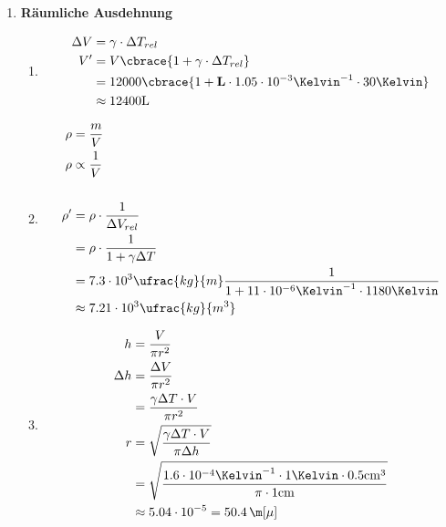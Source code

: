\documentclass[11pt,letterpaper]{article}
\begin{document}
\begin{enumerate}
    
    \item \textbf{Räumliche Ausdehnung}
    \begin{enumerate}
        \item 
            \begin{align*}
                \Delta V &= \gamma \cdot \Delta T _{rel}\\
                V' &=V\cbrace{1+ \gamma \cdot \Delta T _{rel}}\\
                &= 12000\cbrace{1+\mathbf{L} \cdot 1.05\cdot 10^{-3} \Kelvin ^{-1} \cdot 30\Kelvin}\\
                &\approx 12400 \mathrm{L}\\
            \end{align*}
        \item 
            \begin{align*}
                \rho &= \frac{m}{V}\\
                \rho& \propto \frac{1}{V}\\
                \\
                \rho' &= \rho \cdot \frac{1}{\Delta V_{rel}}\\
                 &= \rho \cdot \frac{1}{1+\gamma \Delta T}\\
                 &= 7.3\cdot 10^{3} \ufrac{kg}{m}\frac{1}{1+11\cdot 10^{-6} \Kelvin ^{-1}\cdot 1180\Kelvin}\\
                 &\approx 7.21\cdot 10^{3} \ufrac{kg}{m^3}
            \end{align*}
        \item 
            \begin{align*}
                 h &= \frac{V}{\pi r^2}\\
                 \Delta h &= \frac{\Delta V}{\pi r^2}\\
                 &= \frac{\gamma \Delta T\cdot V}{\pi r^2}\\
                 r&= \sqrt{\frac{\gamma \Delta T\cdot V}{\pi \Delta h}}\\
                 &= \sqrt{\frac{1.6\cdot 10^{-4}\Kelvin^{-1} \cdot 1\Kelvin \cdot 0.5\mathrm{cm}^3}{\pi\cdot 1\mathrm{cm}}}\\
                &\approx 5.04\cdot10^{-5} = 50.4 \,\m[\mu]\\
            \end{align*}
    \end{enumerate}


\end{enumerate}
\end{document}
